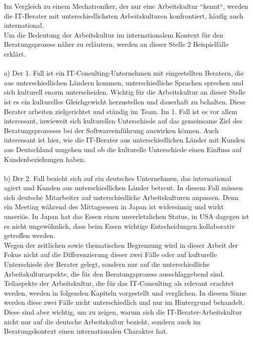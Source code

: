 Im Vergleich zu einem Mechatroniker, der nur eine Arbeitskultur ``kennt``, werden die IT-Berater mit unterschiedlichsten Arbeitskulturen konfrontiert, häufig auch international.\\
Um die Bedeutung der Arbeitskultur im internationalem Kontext für den Beratungsprozess näher zu erläutern, werden an dieser Stelle 2 Beispielfälle erklärt.\\
	 \\
	 a) Der 1. Fall ist ein IT-Consulting-Unternehmen mit eingestellten Beratern, die aus unterschiedlichen Ländern kommen, unterschiedliche Sprachen sprechen und sich kulturell enorm unterscheiden. Wichtig für die Arbeitskultur an dieser Stelle ist es ein kulturelles Gleichgewicht herzustellen und dauerhaft zu behalten. Diese Berater arbeiten zielgerichtet und ständig im Team. Im 1. Fall ist es vor allem  interessant, inwieweit sich kulturellen Unterschiede auf das gemeinsame Ziel des Beratungsprozesses bei der Softwareeinführung auswirken können. Auch interessant ist hier, wie die IT-Berater aus unterschiedlichen Länder mit Kunden aus Deutschland umgehen und ob die kulturelle Unterschiede einen Einfluss auf Kundenbeziehungen haben. \\
	 \\
	 b) Der 2. Fall bezieht sich auf ein deutsches Unternehmen, das international agiert und Kunden aus unterschiedlichen Länder betreut. In diesem Fall müssen sich deutsche Mitarbeiter auf unterschiedliche Arbeitskulturen anpassen. Denn ein Meeting während des Mittagsessen in Japan ist widersinnig und wirkt unseriös. In Japan hat das Essen einen unverletzlichen Status, in USA dagegen ist es nicht ungewöhnlich, dass beim Essen wichtige Entscheidungen kollaborativ getroffen werden.\\
	Wegen der zeitlichen sowie thematischen Begrenzung wird in dieser Arbeit der Fokus nicht auf die Differenzierung dieser zwei Fälle oder auf kulturelle Unterschiede der Berater gelegt, sondern nur auf die unterschiedliche Arbeitskulturaspekte, die für den Beratungsprozess ausschlaggebend sind. Teilaspekte der Arbeitskultur, die für das IT-Consulting als relevant erachtet werden, werden in folgenden Kapiteln vorgestellt und verglichen. In diesem Sinne werden diese zwei Fälle nicht unterschiedlich und nur im Hintergrund behandelt.
	Diese sind aber wichtig, um zu zeigen, warum sich die IT-Berater-Arbeitskultur nicht nur auf die deutsche Arbeitskultur bezieht, sondern auch im Beratungskontext einen internationalen Charakter hat.\\
	\\
